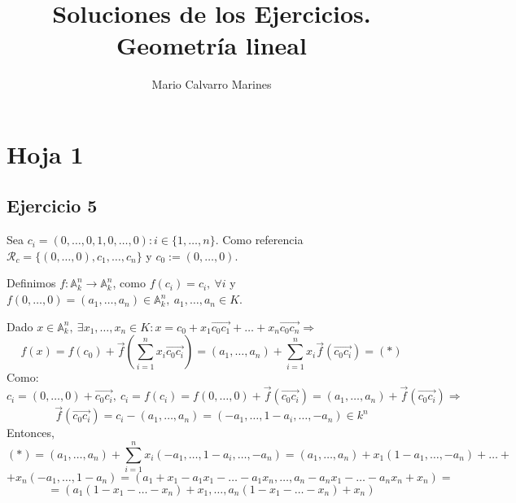 \documentclass[10pt,a4paper,openright]{book}
\title{Soluciones de los Ejercicios. Geometría lineal}
\author{Mario Calvarro Marines}
\date{}
\theoremstyle{break}
\begin{document}
\maketitle
\setcounter{tocdepth}{3}%
\tableofcontents
\chapter{Hoja 1}%
\label{cha:hoja_1}
\section{Ejercicio 5}%
\label{sec:5}
Sea $c_i = \left( 0, \ldots, 0, 1, 0, \ldots, 0 \right): i \in \{1, \ldots, n\}$. Como referencia $\mathcal{R}_c = \{\left( 0, \ldots, 0 \right), c_1, \ldots, c_n\}$ y $c_0 := \left( 0, \ldots, 0 \right)$. 

Definimos $f: \mathbb{A}^{n}_k \rightarrow \mathbb{A}^{n}_k$, como $f\left( c_i \right) = c_i,\ \forall i$ y $f\left( 0, \ldots, 0 \right) = \left( a_1, \ldots, a_n \right) \in \mathbb{A}^{n}_k,\ a_1, \ldots, a_n \in K$.

Dado $x \in \mathbb{A}^{n}_k,\ \exists x_1, \ldots, x_n \in K: x = c_0 + x_1\overrightarrow{c_0c_1} + \ldots + x_n \overrightarrow{c_0c_n} \Rightarrow$
\[
f\left( x \right) = f\left( c_0 \right)  + \overrightarrow{f} \left( \sum_{i=1}^{n} x_i \overrightarrow{c_0c_i} \right) = \left( a_1, \ldots, a_n \right) + \sum_{i=1}^{n} x_i \overrightarrow{f} \left( \overrightarrow{c_0 c_i} \right) = (*) 
\]
Como:
\[
c_i = \left( 0, \ldots, 0 \right) + \overrightarrow{c_0c_i},\ c_i = f\left( c_i \right) = f\left( 0, \ldots, 0 \right) + \overrightarrow{f} \left( \overrightarrow{c_0c_i} \right) = \left( a_1, \ldots, a_n \right) + \overrightarrow{f} \left( \overrightarrow{c_0c_i} \right) \Rightarrow
\]\[
\overrightarrow{f} \left( \overrightarrow{c_0c_i} \right) = c_i - \left( a_1, \ldots, a_n \right) = \left( -a_1, \ldots, 1 - a_i, \ldots, -a_n \right) \in k^n
\]
Entonces,
\[
(*) = \left( a_1, \ldots, a_n \right) + \sum_{i=1}^{n} x_i\left( -a_1, \ldots, 1 - a_i, \ldots, -a_n \right) = \left( a_1, \ldots, a_n \right) + x_1 \left( 1 - a_1, \ldots, -a_n \right) + \ldots +  
\]\[
+ x_n \left( -a_1, \ldots, 1 - a_n \right) = \left( a_1 + x_1 - a_1x_1 - \ldots -a_1x_n, \ldots, a_n - a_nx_1 - \ldots - a_n x_n + x_n \right) = 
\]\[
= \left( a_1\left( 1 - x_1 - \ldots - x_n \right) + x_1, \ldots, a_n \left( 1 - x_1 - \ldots - x_n \right) + x_n \right)
\]
\end{document}
